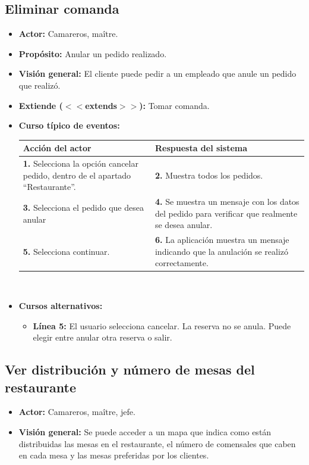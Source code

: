 \documentclass[spanish,a4paper,11pt, twoside]{report}	%
\begin{document}
		\subsection{Eliminar comanda}
			\begin{itemize}
			\item \textbf{Actor:} Camareros, maître.
			\item \textbf{Propósito: } Anular un pedido realizado.
			\item \textbf{Visión general:} El cliente puede pedir a un empleado que anule un pedido que realizó.
			\item \textbf{Extiende ($<<$extends$>>$):} Tomar comanda.
			\item \textbf{Curso típico de eventos:} 	\\
			\begin{tabular}{|p{6cm}||p{6cm}|}
				\hline
				\textbf{Acción del actor} & \textbf{Respuesta del sistema} \\ \hline \hline
				\textbf{1.} Selecciona la opción cancelar pedido, dentro de el apartado ``Restaurante''. & 
				\textbf{2.} Muestra todos los pedidos. \\ \hline
				\textbf{3.} Selecciona el pedido que desea anular	& 
				\textbf{4.} Se muestra un mensaje con los datos del pedido para verificar que realmente se desea anular. \\ \hline
				\textbf{5.} Selecciona continuar.	& 
				\textbf{6.} La aplicación muestra un mensaje indicando que la anulación se realizó correctamente. \\ \hline
			\end{tabular}
			\\
			\item \textbf{Cursos alternativos:} 
			\begin{itemize}
			\item  \textbf{Línea 5:} El usuario selecciona cancelar. La reserva no se anula. 
				Puede elegir entre anular otra reserva o salir.
			\end {itemize}
		\end {itemize}
		


			
		\subsection{Ver distribución y número de mesas del restaurante}
			\begin{itemize}
				\item \textbf{Actor:} Camareros, maître, jefe.
				\item \textbf{Visión general:} Se puede acceder a un mapa que indica como están
					distribuidas las mesas en el restaurante, el número de comensales que caben en
					cada mesa y las mesas preferidas por los clientes.
			\end {itemize}
\end{document}
